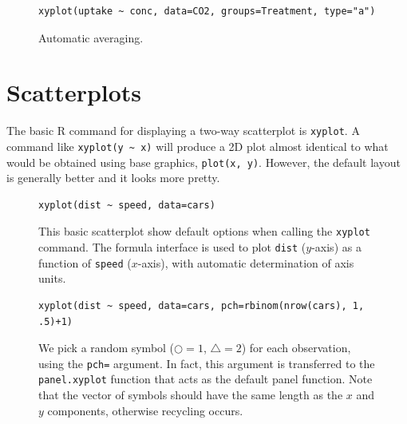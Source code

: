 \documentclass[a4paper,twoside]{book}
\newcounter{fig}
\newcommand{\img}[1]{\texttt{[image: \#1]}\stepcounter{fig}}
\renewcommand{\texttt}[1]{\lstinline{#1}}
\newcommand{\R}{\textsf{R}\xspace}
\begin{document}
\begin{figure}[H]
\begin{lstlisting}
xyplot(uptake ~ conc, data=CO2, groups=Treatment, type="a")
\end{lstlisting}
  \fcapside[\FBwidth] {\img{figs_lattice-crop}}
  {\caption*{Automatic averaging.}}
\end{figure}




\section{Scatterplots}\label{sec:scatterplot}
The basic \R command for displaying a two-way scatterplot is
\texttt{xyplot}. A command like \texttt{xyplot(y ~ x)} will produce a
2D plot almost identical to what would be obtained using base
graphics, \texttt{plot(x, y)}. However, the default layout is
generally better and it looks more pretty.

\begin{figure}[H]
\begin{lstlisting}
xyplot(dist ~ speed, data=cars)
\end{lstlisting}
  \fcapside[\FBwidth] {\img{figs_lattice-crop}}
  {\caption*{This basic scatterplot show default
      options when calling the \texttt{xyplot} command. The formula
      interface is used to plot \texttt{dist} ($y$-axis) as a function
      of \texttt{speed} ($x$-axis), with automatic determination of
      axis units.}}
\end{figure}



\begin{figure}[H]
\begin{lstlisting}
xyplot(dist ~ speed, data=cars, pch=rbinom(nrow(cars), 1, .5)+1)
\end{lstlisting}
  \fcapside[\FBwidth] {\img{figs_lattice-crop}} {\caption*{We pick a
      random symbol (${\scriptstyle\Circle}=1$,
      ${\scriptstyle\triangle}=2$) for each observation, using the
      \texttt{pch=} argument. In fact, this argument is transferred to
      the \texttt{panel.xyplot} function that acts as the default
      panel function. Note that the vector of symbols should have the
      same length as the $x$ and $y$ components, otherwise recycling
      occurs.}}
\end{figure}
\end{document}
